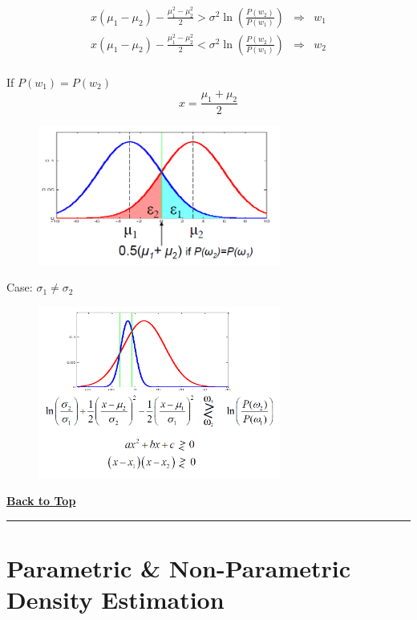\documentclass[letterpaper,10pt]{article}
\newcommand{\pandochline}{\vspace{2em}\href{./document.html}{\textbf{Back to Top}}
	\vspace{-2em}\begin{center}\rule{\textwidth}{1pt}\end{center}}
\begin{document}
\begin{equation}
\begin{array}{rcl}
x(\mu_1-\mu_2) - \frac{\mu_1^2-\mu_2^2}{2} > \sigma^2 \ln(\frac{P(w_2)}{P(w_1)}) & \Rightarrow & w_1 \\
x(\mu_1-\mu_2) - \frac{\mu_1^2-\mu_2^2}{2} < \sigma^2 \ln(\frac{P(w_2)}{P(w_1)}) & \Rightarrow & w_2 \\
\end{array}
\end{equation}

If $P(w_1)=P(w_2)$
\begin{equation}
x = \frac{\mu_1+\mu_2}{2}
\end{equation}

\begin{figure}[!ht]
	\centering
	\includegraphics[width=8cm]{./img/gaussian_linear_classifier.png}
\end{figure}

Case: $\sigma_1\neq\sigma_2$

\begin{figure}[!ht]
	\centering
	\includegraphics[width=8cm]{./img/guassian_quadratic_classifier.png}
\end{figure}

\pandochline
\section{Parametric \& Non-Parametric Density Estimation}
\end{document}
